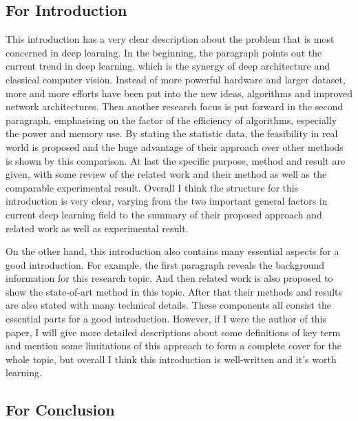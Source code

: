 \documentclass{article}
\begin{document}
\subsection{For Introduction}
{\large	

This introduction has a very clear description about the problem that is most concerned in deep learning. In the beginning, the paragraph points out the current trend in deep learning, which is the synergy of deep architecture and classical computer vision. Instead of more powerful hardware and larger dataset, more and more efforts have been put into the new ideas, algorithms and improved network architectures. Then another research focus is put forward in the second paragraph, emphasising on the factor of the efficiency of algorithms, especially the power and memory use. By stating the statistic data, the feasibility in real world is proposed and the huge advantage of their approach over other methods is shown by this comparison. At last the specific purpose, method and result are given, with some review of the related work and their method as well as the comparable experimental result. Overall I think the structure for this introduction is very clear, varying from the two important general factors in current deep learning field to the summary of their proposed approach and related work as well as experimental result.

On the other hand, this introduction also contains many essential aspects for a good introduction. For example, the first paragraph reveals the background information for this research topic. And then related work is also proposed to show the state-of-art method in this topic. After that their methods and results are also stated with many technical details. These components all consist the essential parts for a good introduction. However, if I were the author of this paper, I will give more detailed descriptions about some definitions of key term and mention some limitations of this approach to form a complete cover for the whole topic, but overall I think this introduction is well-written and it's worth learning.

}


\subsection{For Conclusion}
\end{document}
